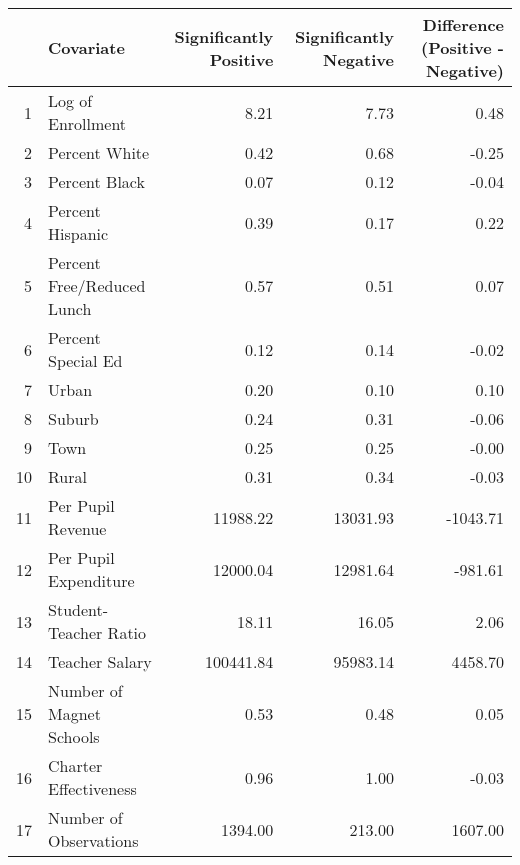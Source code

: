\begin{tabular}{rlrrr}
  \hline
 & Covariate & Significantly Positive & Significantly Negative & Difference (Positive - Negative) \\ 
  \hline
1 & Log of Enrollment & 8.21 & 7.73 & 0.48 \\ 
  2 & Percent White & 0.42 & 0.68 & -0.25 \\ 
  3 & Percent Black & 0.07 & 0.12 & -0.04 \\ 
  4 & Percent Hispanic & 0.39 & 0.17 & 0.22 \\ 
  5 & Percent Free/Reduced Lunch & 0.57 & 0.51 & 0.07 \\ 
  6 & Percent Special Ed & 0.12 & 0.14 & -0.02 \\ 
  7 & Urban & 0.20 & 0.10 & 0.10 \\ 
  8 & Suburb & 0.24 & 0.31 & -0.06 \\ 
  9 & Town & 0.25 & 0.25 & -0.00 \\ 
  10 & Rural & 0.31 & 0.34 & -0.03 \\ 
  11 & Per Pupil Revenue & 11988.22 & 13031.93 & -1043.71 \\ 
  12 & Per Pupil Expenditure & 12000.04 & 12981.64 & -981.61 \\ 
  13 & Student-Teacher Ratio & 18.11 & 16.05 & 2.06 \\ 
  14 & Teacher Salary & 100441.84 & 95983.14 & 4458.70 \\ 
  15 & Number of Magnet Schools & 0.53 & 0.48 & 0.05 \\ 
  16 & Charter Effectiveness & 0.96 & 1.00 & -0.03 \\ 
  17 & Number of Observations & 1394.00 & 213.00 & 1607.00 \\ 
   \hline
\end{tabular}
